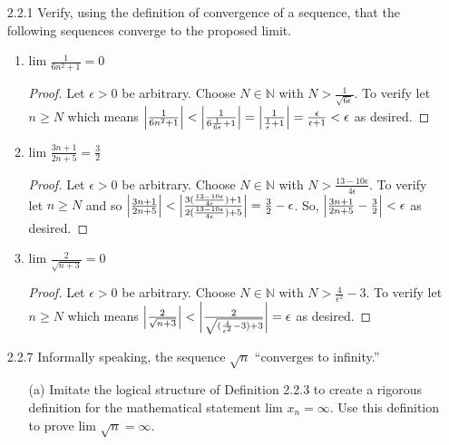 \documentclass[12pt,letterpaper]{article}
\begin{document}
\begin{itemize}[leftmargin=!,labelindent=5pt]
    \item [2.2.1] Verify, using the definition of convergence of a sequence, that the following sequences converge to the proposed limit.
        \begin{enumerate}
            \item lim $\frac{1}{6n^2 + 1}=0$
                \begin{proof}
                    Let $\epsilon > 0$ be arbitrary.
                    Choose $N \in \mathbb{N}$ with $N > \frac{1}{\sqrt{6\epsilon}}$.
                    To verify let $n \geq N$ which means $\abs{\frac{1}{6n^2 + 1}} < \abs{\frac{1}{6\frac{1}{6\epsilon} + 1}} = \abs{\frac{1}{\frac{1}{\epsilon} + 1}} = \frac{\epsilon}{\epsilon + 1} < \epsilon$ as desired.
                \end{proof}
            \item lim $\frac{3n+1}{2n + 5}=\frac{3}{2}$
                \begin{proof}
                    Let $\epsilon > 0$ be arbitrary.
                    Choose $N \in \mathbb{N}$ with $N > \frac{13-10\epsilon}{4\epsilon}$.
                    To verify let $n \geq N$ and so $\abs{\frac{3n+1}{2n + 5}} < \abs{\frac{3(\frac{13-10\epsilon}{4\epsilon})+1}{2(\frac{13-10\epsilon}{4\epsilon}) + 5}}= \frac{3}{2}-\epsilon$.
                    So, $\abs{\frac{3n+1}{2n + 5}-\frac{3}{2}}< \epsilon$ as desired.
                \end{proof}
            \item lim $\frac{2}{\sqrt{n+3}}=0$
                \begin{proof}
                    Let $\epsilon > 0$ be arbitrary. Choose $N \in \mathbb{N}$ with $N > \frac{4}{\epsilon^2}-3$. To verify let $n \geq N$ which means $\abs{\frac{2}{\sqrt{n+3}}}<\abs{\frac{2}{\sqrt{(\frac{4}{\epsilon^2}-3)+3}}}=\epsilon$ as desired.
                \end{proof}
        \end{enumerate}
    \item [2.2.7] Informally speaking, the sequence $\sqrt{n}$ “converges to infinity.”
        \begin{itemize}
            \item [(a)] Imitate the logical structure of Definition 2.2.3 to create a rigorous definition for the mathematical statement lim $x_n = \infty$. Use this definition to prove lim $\sqrt{n} = \infty$. 
            

\end{itemize}
\end{itemize}
\end{document}
